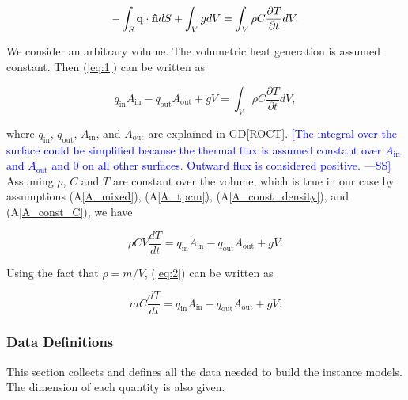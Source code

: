 \documentclass[12pt]{article}
\newcommand{\authornote}[3]{\textcolor{#1}{[#3 ---#2]}}
\newcommand{\authornote}[3]{}
\newcommand{\wss}[1]{\authornote{blue}{SS}{#1}}
\newcommand{\dref}[1]{GD\ref{#1}}
\newcommand{\aref}[1]{A\ref{#1}}
\begin{document}
\begin{equation}
-\int_S{ \bf{q\cdot \hat n}} dS+\int_V g dV= \int_V \rho C \frac{\partial T}{\partial t}dV. \label{eq:1}
\end{equation}

\noindent
We consider an arbitrary volume.  The volumetric heat generation is assumed
constant.  Then (\ref{eq:1}) can be written as


\begin{equation*}
  q_{\mathrm{in}} A_{\mathrm{in}} - q_{\mathrm{out}} A_{\mathrm{out}} + g V = \int_V \rho C \frac{\partial T}{\partial t}dV,
\end{equation*}

\noindent where $q_{\mathrm{in}}$, $q_{\mathrm{out}}$, $A_{\mathrm{in}}$, and 
$A_{\mathrm{out}}$ are explained in \dref{ROCT}.  \wss{The integral over the
  surface could be simplified because the thermal flux is assumed constant over
  $A_\text{in}$ and $A_\text{out}$ and $0$ on all other surfaces.  Outward flux
  is considered positive.}  Assuming $\rho$, $C$ and $T$ are
constant over the volume, which is true in our case by assumptions (\aref{A_mixed}),
(\aref{A_tpcm}), (\aref{A_const_density}), and (\aref{A_const_C}), we have

\begin{equation}
\rho C V\frac{dT}{dt} = q_{\mathrm{in}} A_{\mathrm{in}} - q_{\mathrm{out}} A_{\mathrm{out}} + g V. \label{eq:2}
\end{equation}

\noindent
Using the fact that $\rho = {m}/{V}$, (\ref{eq:2}) can be written as

\begin{equation*}
m C \frac{dT}{dt} = q_{\mathrm{in}} A_{\mathrm{in}} - q_{\mathrm{out}} A_{\mathrm{out}} + g V.
\end{equation*}

\subsubsection{Data Definitions}\label{sec_datadef}

This section collects and defines all the data needed to build the instance
models. The dimension of each quantity is also given.

~\newline
\end{document}
